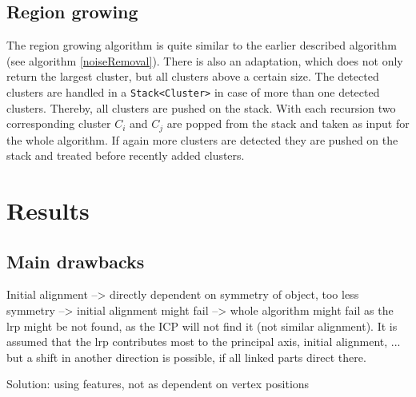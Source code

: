 \subsection{Region growing}
\label{RegionGrowing}
The region growing algorithm is quite similar to the earlier described algorithm (see algorithm \ref{noiseRemoval}). There is also an adaptation, which does not only return the largest cluster, but all clusters above a certain size. The detected clusters are handled in a \texttt{Stack<Cluster>} in case of more than one detected clusters. Thereby, all clusters are pushed on the stack. With each recursion two corresponding cluster $C_i$ and $C_j$ are popped from the stack and taken as input for the whole algorithm. If again more clusters are detected they are pushed on the stack and treated before recently added clusters.



\section{Results}
\label{ResultsLRP}


\subsection{Main drawbacks}
Initial alignment --> directly dependent on symmetry of object, too less symmetry --> initial alignment might fail --> whole algorithm might fail as the lrp might be not found, as the ICP will not find it (not similar alignment). It is assumed that the lrp contributes most to the principal axis, initial alignment, ... but a shift in another direction is possible, if all linked parts direct there.

Solution: using features, not as dependent on vertex positions









